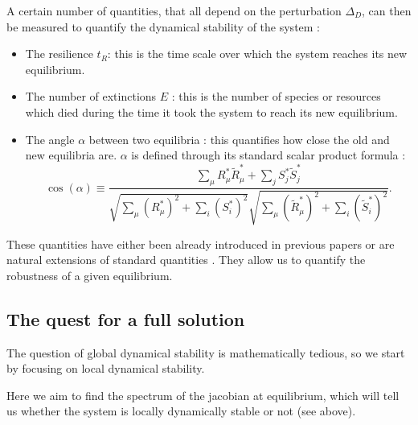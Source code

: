\documentclass[12pt, titlepage]{report}
\begin{document}
A certain number of quantities, that all depend on the perturbation $\Delta_D$, can then be measured to quantify the dynamical stability of the system :
\begin{itemize}
  \item The resilience $t_R$: this is the time scale over which the system reaches its new equilibrium.
  \item The number of extinctions $E$ : this is the number of species or resources which died during the time it took the system to reach its new equilibrium.
  \item The angle $\alpha$ between two equilibria : this quantifies how close the old and new equilibria are. $\alpha$ is defined through its standard scalar product formula :
  \begin{equation}
  \cos(\alpha) \equiv \frac{\sum_\mu R^*_\mu \tilde{R}^*_\mu + \sum_j S^*_j\tilde{S}^*_j}{\sqrt{\sum_\mu \left(R^*_\mu\right)^2 + \sum_i \left(S^*_i\right)^2}\sqrt{\sum_\mu \left(\tilde{R}^*_\mu\right)^2 + \sum_i \left(\tilde{S}^*_i\right)^2}}.
  \end{equation}
\end{itemize}
These quantities have either been already introduced in previous papers or are natural extensions of standard quantities \cite{ives_stability_2007,pascual-garcia_mutualism_2017}. They allow us to quantify the robustness of a given equilibrium.

\subsection{The quest for a full solution}
The question of global dynamical stability is mathematically tedious, so we start by focusing on local dynamical stability.

Here we aim to find the spectrum of the jacobian at equilibrium, which will tell us whether the system is locally dynamically stable or not (see above).
\end{document}

